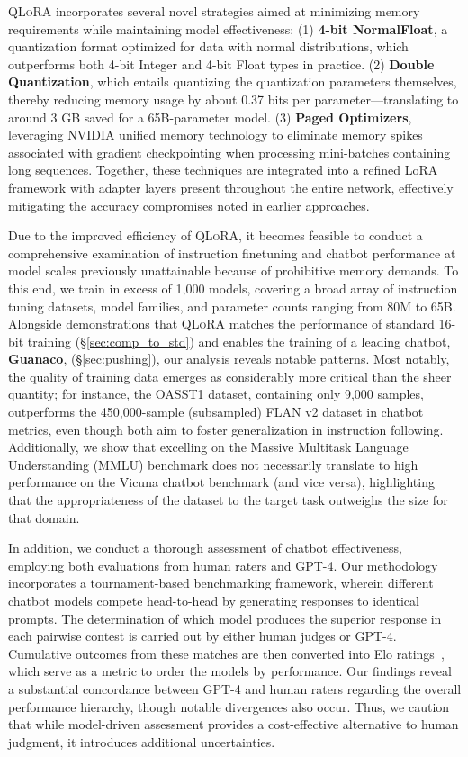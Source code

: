 \textsc{QLoRA} incorporates several novel strategies aimed at minimizing memory requirements while maintaining model effectiveness: (1) \textbf{4-bit NormalFloat}, a quantization format optimized for data with normal distributions, which outperforms both 4-bit Integer and 4-bit Float types in practice. (2) \textbf{Double Quantization}, which entails quantizing the quantization parameters themselves, thereby reducing memory usage by about 0.37 bits per parameter—translating to around 3 GB saved for a 65B-parameter model. (3) \textbf{Paged Optimizers}, leveraging NVIDIA unified memory technology to eliminate memory spikes associated with gradient checkpointing when processing mini-batches containing long sequences. Together, these techniques are integrated into a refined LoRA framework with adapter layers present throughout the entire network, effectively mitigating the accuracy compromises noted in earlier approaches.

Due to the improved efficiency of \textsc{QLoRA}, it becomes feasible to conduct a comprehensive examination of instruction finetuning and chatbot performance at model scales previously unattainable because of prohibitive memory demands. To this end, we train in excess of 1,000 models, covering a broad array of instruction tuning datasets, model families, and parameter counts ranging from 80M to 65B. Alongside demonstrations that \textsc{QLoRA} matches the performance of standard 16-bit training (\S\ref{sec:comp_to_std}) and enables the training of a leading chatbot, \textbf{Guanaco}, (\S\ref{sec:pushing}), our analysis reveals notable patterns. Most notably, the quality of training data emerges as considerably more critical than the sheer quantity; for instance, the OASST1 dataset, containing only 9,000 samples, outperforms the 450,000-sample (subsampled) FLAN v2 dataset in chatbot metrics, even though both aim to foster generalization in instruction following. Additionally, we show that excelling on the Massive Multitask Language Understanding (MMLU) benchmark does not necessarily translate to high performance on the Vicuna chatbot benchmark (and vice versa), highlighting that the appropriateness of the dataset to the target task outweighs the size for that domain.

In addition, we conduct a thorough assessment of chatbot effectiveness, employing both evaluations from human raters and GPT-4. Our methodology incorporates a tournament-based benchmarking framework, wherein different chatbot models compete head-to-head by generating responses to identical prompts. The determination of which model produces the superior response in each pairwise contest is carried out by either human judges or GPT-4. Cumulative outcomes from these matches are then converted into Elo ratings~\citep{elo1967proposed, elo1978rating}, which serve as a metric to order the models by performance. Our findings reveal a substantial concordance between GPT-4 and human raters regarding the overall performance hierarchy, though notable divergences also occur. Thus, we caution that while model-driven assessment provides a cost-effective alternative to human judgment, it introduces additional uncertainties.

